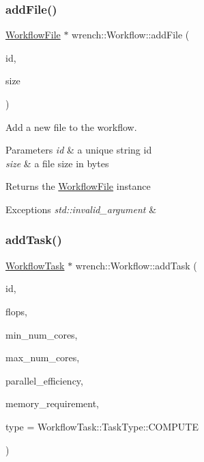 \subsubsection{\texorpdfstring{add\+File()}{addFile()}}
{\footnotesize\ttfamily \hyperlink{classwrench_1_1_workflow_file}{Workflow\+File} $\ast$ wrench\+::\+Workflow\+::add\+File (\begin{DoxyParamCaption}\item[{std\+::string}]{id,  }\item[{double}]{size }\end{DoxyParamCaption})}



Add a new file to the workflow. 


\begin{DoxyParams}{Parameters}
{\em id} & a unique string id \\
\hline
{\em size} & a file size in bytes\\
\hline
\end{DoxyParams}
\begin{DoxyReturn}{Returns}
the \hyperlink{classwrench_1_1_workflow_file}{Workflow\+File} instance
\end{DoxyReturn}

\begin{DoxyExceptions}{Exceptions}
{\em std\+::invalid\+\_\+argument} & \\
\hline
\end{DoxyExceptions}
\mbox{\label{classwrench_1_1_workflow_aa19c92f95eaf58aed7924adb426d01bf}} 
\subsubsection{\texorpdfstring{add\+Task()}{addTask()}}
{\footnotesize\ttfamily \hyperlink{classwrench_1_1_workflow_task}{Workflow\+Task} $\ast$ wrench\+::\+Workflow\+::add\+Task (\begin{DoxyParamCaption}\item[{std\+::string}]{id,  }\item[{double}]{flops,  }\item[{unsigned long}]{min\+\_\+num\+\_\+cores,  }\item[{unsigned long}]{max\+\_\+num\+\_\+cores,  }\item[{double}]{parallel\+\_\+efficiency,  }\item[{double}]{memory\+\_\+requirement,  }\item[{\hyperlink{classwrench_1_1_workflow_task_a490a935259b9425a3e4fb011a86cb4bf}{Workflow\+Task\+::\+Task\+Type}}]{type = {\ttfamily WorkflowTask\+:\+:TaskType\+:\+:COMPUTE} }\end{DoxyParamCaption})}



